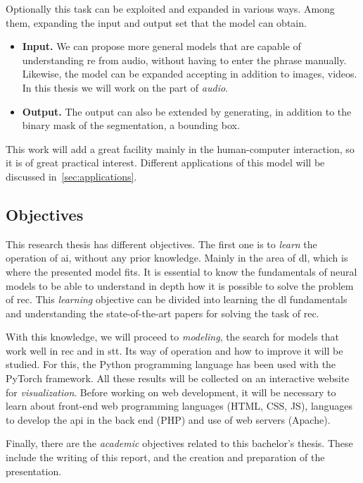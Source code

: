 Optionally this task can be exploited and expanded in various ways. Among them,
expanding the input and output set that the model can obtain.
\begin{itemize}
  \item \textbf{Input.} We can propose more general models that are capable
  of understanding \gls{re} from audio, without having to enter the phrase
  manually. Likewise, the model can be expanded accepting in addition to
  images, videos. In this thesis we will work on the part of \emph{audio}.
  \item \textbf{Output.} The output can also be extended by generating, in
  addition to the binary mask of the segmentation, a bounding
  box.
\end{itemize}

This work will add a great facility mainly in the human-computer interaction,
so it is of great practical interest. Different applications of this model will
be discussed in\ \vref{sec:applications}.


\subsection{Objectives}

This research thesis has different objectives. The first one is to \emph{learn}
the operation of \gls{ai}, without any prior knowledge. Mainly in the area of
\gls{dl}, which is where the presented model fits. It is essential to know the
fundamentals of neural models to be able to understand in depth how it is
possible to solve the problem of \gls{rec}. This \emph{learning} objective can
be divided into learning the \gls{dl} fundamentals and understanding the
state-of-the-art papers for solving the task of \gls{rec}.

With this knowledge, we will proceed to \emph{modeling}, the search for models
that work well in \gls{rec} and in \gls{stt}. Its way of operation and how to
improve it will be studied. For this, the Python programming language has been
used with the PyTorch framework. All these results will be collected on an
interactive website for \emph{visualization}. Before working on web
development, it will be necessary to learn about front-end web programming
languages (HTML, CSS, JS), languages to develop the \gls{api} in the back end
(PHP) and use of web servers (Apache).

Finally, there are the \emph{academic} objectives related to this bachelor's
thesis. These include the writing of this report, and the creation and
preparation of the presentation.


